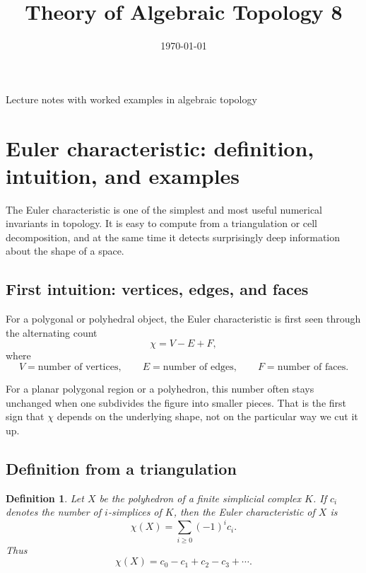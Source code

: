 \documentclass[12pt,a4paper]{article}
\title{\vspace{-1.5em}\bfseries Theory of Algebraic Topology 8}
\author{}
\date{\today}
\newtheorem{definition}{Definition}[section]
\theoremstyle{notespace}
\begin{document}
	\maketitle
	\thispagestyle{plain}
		\begin{center}
		\begin{minipage}{0.92\textwidth}
			Lecture notes with worked examples in algebraic topology
		\end{minipage}
	\end{center}
		\tableofcontents
	\clearpage

\section{Euler characteristic: definition, intuition, and examples}

The Euler characteristic is one of the simplest and most useful numerical invariants in topology. It is easy to compute from a triangulation or cell decomposition, and at the same time it detects surprisingly deep information about the shape of a space.

\subsection{First intuition: vertices, edges, and faces}

For a polygonal or polyhedral object, the Euler characteristic is first seen through the alternating count
\[
\chi = V-E+F,
\]
where
\[
V=\text{number of vertices},\qquad
E=\text{number of edges},\qquad
F=\text{number of faces}.
\]

For a planar polygonal region or a polyhedron, this number often stays unchanged when one subdivides the figure into smaller pieces. That is the first sign that \(\chi\) depends on the underlying shape, not on the particular way we cut it up.

\subsection{Definition from a triangulation}

\begin{definition}
	Let \(X\) be the polyhedron of a finite simplicial complex \(K\). If \(c_i\) denotes the number of \(i\)-simplices of \(K\), then the \emph{Euler characteristic} of \(X\) is
	\[
	\chi(X)=\sum_{i\ge 0}(-1)^i c_i.
	\]
	Thus
	\[
	\chi(X)=c_0-c_1+c_2-c_3+\cdots.
	\]
\end{definition}
\end{document}

